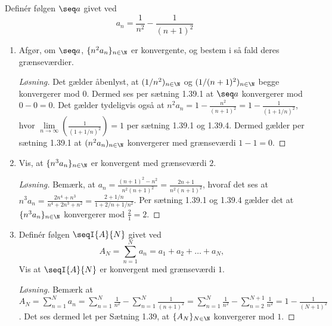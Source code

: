 \begin{opg}
Definér følgen $\seq a$ givet ved
    $$ a_n = \frac{1}{n^2} - \frac{1}{(n+1)^2} $$
\begin{enumerate}
    \item Afgør, om $\seq a$, $\{n^2a_n\}_{n\in \N}$ er konvergente, og bestem i så fald deres grænseværdier.
    
    \ifanswers \begin{proof}[Løsning]
    	Det gælder åbenlyst, at $ (1/n^2)_{n\in\N} $ og $ (1/(n+1)^2)_{n\in\N} $ begge konvergerer mod $ 0 $. Dermed ses per sætning 1.39.1 at $ \seq a $ konvergerer mod $ 0-0=0 $. Det gælder tydeligvis også at $ n^2a_n=1-\frac{n^2}{(n+1)^2}=1-\frac{1}{(1+1/n)^2} $, hvor $ \lim\limits_{n\to\infty}\left(\frac{1}{(1+1/n)^2}\right)=1 $ per sætning 1.39.1 og 1.39.4. Dermed gælder per sætning 1.39.1 at $ (n^2a_n)_{n\in\N} $ konvergerer med grænseværdi $ 1-1=0 $.
    \end{proof} \fi
    
    
    \item Vis, at $\{n^3a_n\}_{n\in\N}$ er konvergent med grænseværdi $2$.
    \ifanswers \begin{proof}[Løsning]
    	Bemærk, at $ a_n=\frac{(n+1)^2-n^2}{n^2(n+1)^2}=\frac{2n+1}{n^2(n+1)^2} $, hvoraf det ses at $ n^3a_n=\frac{2n^4+n^3}{n^4+2n^3+n^2}=\frac{2+1/n}{1+2/n+1/n^2} $. Per sætning 1.39.1 og 1.39.4 gælder det at $ \{n^3a_n\}_{n\in\N} $ konvergerer mod $ \frac{2}{1}=2 $.
    \end{proof} \fi
    
    \item Definér følgen $\seqI{A}{N}$ givet ved
    $$ A_N = \sum_{n=1}^N a_n = a_1 + a_2 + \ldots + a_N, $$
    Vis at $\seqI{A}{N}$ er konvergent med grænseværdi $1$.
    \ifanswers \begin{proof}[Løsning]
    	Bemærk at $ A_N=\sum_{n=1}^{N}a_n=\sum_{n=1}^{N}\frac{1}{n^2}-\sum_{n=1}^{N}\frac{1}{(n+1)^2}=\sum_{n=1}^{N}\frac{1}{n^2}-\sum_{n=2}^{N+1}\frac{1}{n^2}=1-\frac{1}{(N+1)^2} $. Det ses dermed let per Sætning 1.39, at $ \{A_N\}_{N\in \N} $ konvergerer mod $ 1 $.
    \end{proof} \fi
\end{enumerate}
\end{opg}


